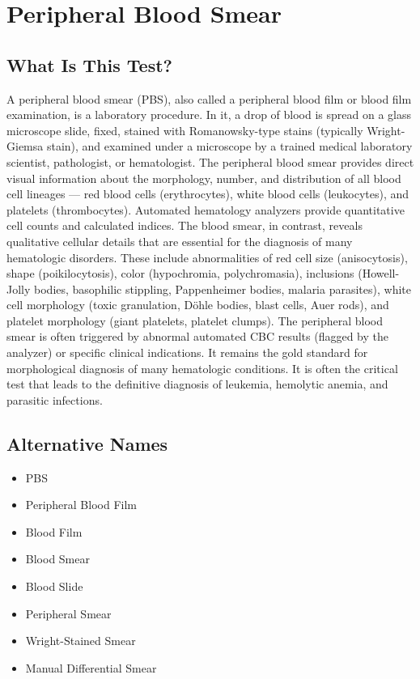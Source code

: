 \chapter{Peripheral Blood Smear}

\section*{What Is This Test?}
A peripheral blood smear (PBS), also called a peripheral blood film or blood film examination, is a laboratory procedure. In it, a drop of blood is spread on a glass microscope slide, fixed, stained with Romanowsky-type stains (typically Wright-Giemsa stain), and examined under a microscope by a trained medical laboratory scientist, pathologist, or hematologist. The peripheral blood smear provides direct visual information about the morphology, number, and distribution of all blood cell lineages --- red blood cells (erythrocytes), white blood cells (leukocytes), and platelets (thrombocytes). Automated hematology analyzers provide quantitative cell counts and calculated indices. The blood smear, in contrast, reveals qualitative cellular details that are essential for the diagnosis of many hematologic disorders. These include abnormalities of red cell size (anisocytosis), shape (poikilocytosis), color (hypochromia, polychromasia), inclusions (Howell-Jolly bodies, basophilic stippling, Pappenheimer bodies, malaria parasites), white cell morphology (toxic granulation, D\"{o}hle bodies, blast cells, Auer rods), and platelet morphology (giant platelets, platelet clumps). The peripheral blood smear is often triggered by abnormal automated CBC results (flagged by the analyzer) or specific clinical indications. It remains the gold standard for morphological diagnosis of many hematologic conditions. It is often the critical test that leads to the definitive diagnosis of leukemia, hemolytic anemia, and parasitic infections.

\section*{Alternative Names}
\begin{itemize}
  \item PBS
  \item Peripheral Blood Film
  \item Blood Film
  \item Blood Smear
  \item Blood Slide
  \item Peripheral Smear
  \item Wright-Stained Smear
  \item Manual Differential Smear
\end{itemize}
